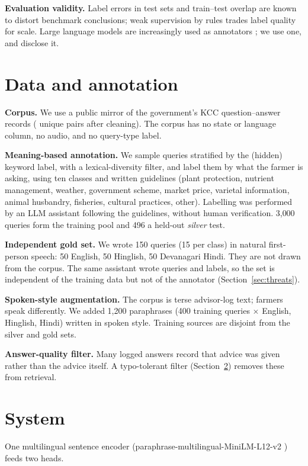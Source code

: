 \documentclass[11pt]{article}
\begin{document}
\textbf{Evaluation validity.} Label errors in test sets \cite{northcutt} and train--test overlap \cite{lewisoverlap} are known to distort benchmark conclusions; weak supervision by rules \cite{ratner} trades label quality for scale. Large language models are increasingly used as annotators \cite{gilardi}; we use one, and disclose it.

\section{Data and annotation}
\label{sec:data}
\textbf{Corpus.} We use a public mirror of the government's KCC question--answer records (\corpusRows{} unique pairs after cleaning). The corpus has no state or language column, no audio, and no query-type label.

\textbf{Meaning-based annotation.} We sample \annN{} queries stratified by the (hidden) keyword label, with a lexical-diversity filter, and label them by what the farmer is asking, using ten classes and written guidelines (plant protection, nutrient management, weather, government scheme, market price, varietal information, animal husbandry, fisheries, cultural practices, other). Labelling was performed by an LLM assistant following the guidelines, without human verification. 3{,}000 queries form the training pool and 496 a held-out \emph{silver} test.

\textbf{Independent gold set.} We wrote 150 queries (15 per class) in natural first-person speech: 50 English, 50 Hinglish, 50 Devanagari Hindi. They are not drawn from the corpus. The same assistant wrote queries and labels, so the set is independent of the training data but not of the annotator (Section~\ref{sec:threats}).

\textbf{Spoken-style augmentation.} The corpus is terse advisor-log text; farmers speak differently. We added 1{,}200 paraphrases (400 training queries $\times$ English, Hinglish, Hindi) written in spoken style. Training sources are disjoint from the silver and gold sets.

\textbf{Answer-quality filter.} Many logged answers record that advice was given rather than the advice itself. A typo-tolerant filter (Section~\ref{sec:system}) removes these from retrieval.

\section{System}
\label{sec:system}
One multilingual sentence encoder (paraphrase-multilingual-MiniLM-L12-v2 \cite{reimersmulti}) feeds two heads.
\end{document}
